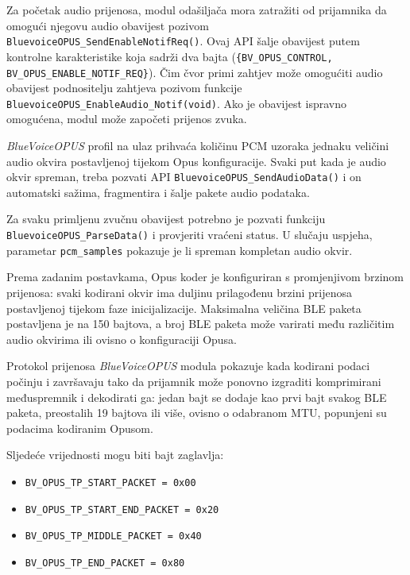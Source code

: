 Za početak audio prijenosa, modul odašiljača mora zatražiti od prijamnika da omogući njegovu audio obavijest pozivom \lstinline|BluevoiceOPUS_SendEnableNotifReq()|. Ovaj API šalje obavijest putem kontrolne karakteristike koja sadrži dva bajta (\lstinline|{BV_OPUS_CONTROL, BV_OPUS_ENABLE_NOTIF_REQ}|). Čim čvor primi zahtjev može omogućiti audio obavijest podnositelju zahtjeva pozivom funkcije \newline \lstinline|BluevoiceOPUS_EnableAudio_Notif(void)|. Ako je obavijest ispravno omogućena, modul može započeti prijenos zvuka.

\textit{BlueVoiceOPUS} profil na ulaz prihvaća količinu PCM uzoraka jednaku veličini audio okvira postavljenoj tijekom Opus konfiguracije. Svaki put kada je audio okvir spreman, treba pozvati API \lstinline|BluevoiceOPUS_SendAudioData()| i on automatski sažima, fragmentira i šalje pakete audio podataka.

Za svaku primljenu zvučnu obavijest potrebno je pozvati funkciju \newline \lstinline|BluevoiceOPUS_ParseData()| i provjeriti vraćeni status. U slučaju uspjeha, parametar \lstinline|pcm_samples| pokazuje je li spreman kompletan audio okvir.

Prema zadanim postavkama, Opus koder je konfiguriran s promjenjivom brzinom prijenosa: svaki kodirani okvir ima  duljinu prilagođenu brzini prijenosa postavljenoj tijekom faze inicijalizacije. Maksimalna veličina BLE paketa postavljena je na 150 bajtova, a broj BLE paketa može varirati među različitim audio okvirima ili ovisno o konfiguraciji Opusa.

Protokol prijenosa \textit{BlueVoiceOPUS} modula pokazuje kada kodirani podaci počinju i završavaju tako da prijamnik može ponovno izgraditi komprimirani međuspremnik i dekodirati ga: jedan bajt se dodaje kao prvi bajt svakog BLE paketa, preostalih 19 bajtova ili više, ovisno o odabranom MTU, popunjeni su podacima kodiranim Opusom.

Sljedeće vrijednosti mogu biti bajt zaglavlja:
\begin{itemize}
	\item \lstinline|BV_OPUS_TP_START_PACKET = 0x00|
	\item \lstinline|BV_OPUS_TP_START_END_PACKET = 0x20|
	\item \lstinline|BV_OPUS_TP_MIDDLE_PACKET = 0x40|
	\item \lstinline|BV_OPUS_TP_END_PACKET = 0x80|
\end{itemize}

